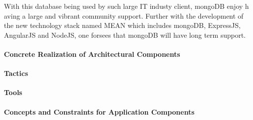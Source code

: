 With this database being used by such large IT industy client, mongoDB enjoy h
aving a large and vibrant community support. Further with the development of
the new technology stack named MEAN which includes mongoDB, ExpressJS, AngularJS
and NodeJS, one forsees that mongoDB will have long term support.

\paragraph{Concrete Realization of Architectural Components}
\paragraph{Tactics}
\paragraph{Tools}
\paragraph{Concepts and Constraints for Application Components}